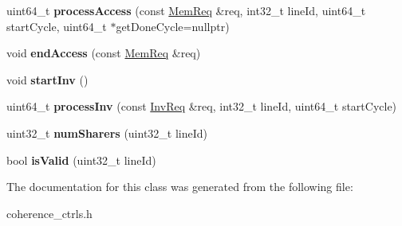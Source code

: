 \begin{DoxyCompactItemize}
\item 
\hypertarget{classMESICC_aa8e01a308fd975cb06ed958fe79b5f5c}{uint64\-\_\-t {\bfseries process\-Access} (const \hyperlink{structMemReq}{Mem\-Req} \&req, int32\-\_\-t line\-Id, uint64\-\_\-t start\-Cycle, uint64\-\_\-t $\ast$get\-Done\-Cycle=nullptr)}\label{classMESICC_aa8e01a308fd975cb06ed958fe79b5f5c}

\item 
\hypertarget{classMESICC_a191b816ae3926a67e832e154682d1556}{void {\bfseries end\-Access} (const \hyperlink{structMemReq}{Mem\-Req} \&req)}\label{classMESICC_a191b816ae3926a67e832e154682d1556}

\item 
\hypertarget{classMESICC_a75c6b7abe753289c3c3e4b63a240bfe0}{void {\bfseries start\-Inv} ()}\label{classMESICC_a75c6b7abe753289c3c3e4b63a240bfe0}

\item 
\hypertarget{classMESICC_adcf52b6d718a2dde14c7c65dcc9556b0}{uint64\-\_\-t {\bfseries process\-Inv} (const \hyperlink{structInvReq}{Inv\-Req} \&req, int32\-\_\-t line\-Id, uint64\-\_\-t start\-Cycle)}\label{classMESICC_adcf52b6d718a2dde14c7c65dcc9556b0}

\item 
\hypertarget{classMESICC_afe175acbb1827ab513a14b42bc9c6672}{uint32\-\_\-t {\bfseries num\-Sharers} (uint32\-\_\-t line\-Id)}\label{classMESICC_afe175acbb1827ab513a14b42bc9c6672}

\item 
\hypertarget{classMESICC_a71f60cbea5b1703241317aca971dccca}{bool {\bfseries is\-Valid} (uint32\-\_\-t line\-Id)}\label{classMESICC_a71f60cbea5b1703241317aca971dccca}

\end{DoxyCompactItemize}


The documentation for this class was generated from the following file\-:\begin{DoxyCompactItemize}
\item 
coherence\-\_\-ctrls.\-h\end{DoxyCompactItemize}

